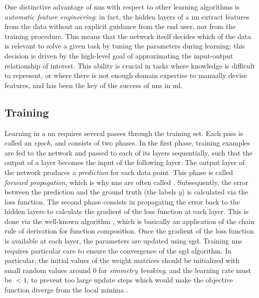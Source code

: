 One distinctive advantage of \glspl{nn} with respect to other learning algorithms is \emph{automatic feature engineering}: in fact, the hidden layers of a \gls{nn} extract features from the data without an explicit guidance from the end user, nor from the training procedure. This means that the network itself decides which  of the data is relevant to solve a given task by tuning the parameters during learning; this decision is driven by the high-level goal of approximating the input-output relationship of interest. This ability is crucial in tasks where knowledge is difficult to represent, or where there is not enough domain expertise to manually devise features, and has been the key of the success of \glspl{nn} in \gls{ml}.

\subsection{Training}\label{sec:training}
Learning in a \gls{nn} requires several passes through the training set. Each pass is called an \emph{epoch}, and consists of two phases. In the first phase, training examples are fed to the network and passed to each of its layers sequentially, such that the output of a layer becomes the input of the following layer. The output layer of the network produces a \emph{prediction} for each data point. This phase is called \emph{forward propagation}, which is why \glspl{nn} are often called . Subsequently, the error between the prediction and the ground truth (the labels $y$) is calculated via the loss function. The second phase consists in propagating the error back to the hidden layers to calculate the gradient of the loss function at each layer. This is done via the well-known  algorithm \citep{rumelhart1986backprop}, which is basically an application of the chain rule of derivation for function composition. Once the gradient of the loss function is available at each layer, the parameters are updated using \gls{sgd}. Training \glspl{nn} requires particular care to ensure the convergence of the \gls{sgd} algorithm. In particular, the initial values of the weight matrices should be initialized with small random values around 0 for \emph{simmetry breaking}, and the learning rate must be $< 1$, to prevent too large update steps which would make the objective function diverge from the local minima \citep{lecun1998backprop}.

